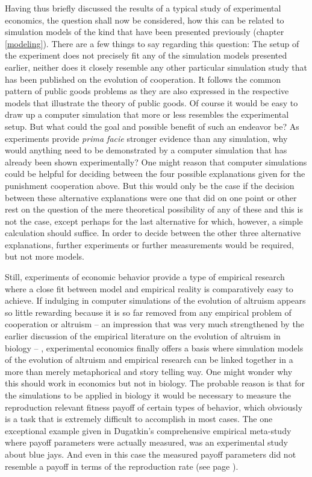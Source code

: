 Having thus briefly discussed the results of a typical study of experimental
economics, the question shall now be considered, how this can be related to
simulation models of the kind that have been presented previously (chapter
\ref{modeling}). There are a few things to say regarding this question: The
setup of the experiment does not precisely fit any of the simulation models
presented earlier, neither does it closely resemble any other particular
simulation study that has been published on the evolution of cooperation. It
follows the common pattern of public goods problems as they are also
expressed in the respective models that illustrate the theory of public goods.
Of course it would be easy to draw up a computer simulation that more or less
resembles the experimental setup. But what could the goal and possible benefit
of such an endeavor be? As experiments provide {\em prima facie} stronger
evidence than any simulation, why would anything need to be demonstrated by a
computer simulation that has already been shown experimentally? One might
reason that computer simulations could be helpful for deciding between the
four possible explanations given for the punishment cooperation above. But
this would only be the case if the decision between these alternative
explanations were one that did on one point or other rest on the question
of the mere theoretical possibility of any of these and this is not the case,
except perhaps for the last alternative for which, however, a simple
calculation should suffice. In order to decide between the other three
alternative explanations, further experiments or further measurements would be
required, but not more models.

Still, experiments of economic behavior provide a type of empirical
research where a close fit between model and empirical reality is
comparatively easy to achieve. If indulging in computer simulations of the
evolution of altruism appears so little rewarding because it is so far
removed from any empirical problem of cooperation or altruism -- an impression
that was very much strengthened by the earlier discussion of the empirical
literature on the evolution of altruism in biology -- , experimental economics
finally offers a basis where simulation models of the evolution of altruism
and empirical research can be linked together in a more than merely
metaphorical and story telling way. One might wonder why this should work in
economics but not in biology. The probable reason is that for the simulations
to be applied in biology it would be necessary to measure the reproduction
relevant fitness payoff of certain types of behavior, which obviously is a
task that is extremely difficult to accomplish in most cases. The one
exceptional example given in Dugatkin's comprehensive empirical meta-study
\cite[]{dugatkin:1997} where payoff parameters were actually measured, was an
experimental study about blue jays.  And even in this case the measured payoff
parameters did not resemble a payoff in terms of the reproduction rate (see
page \pageref{bluejays}).

